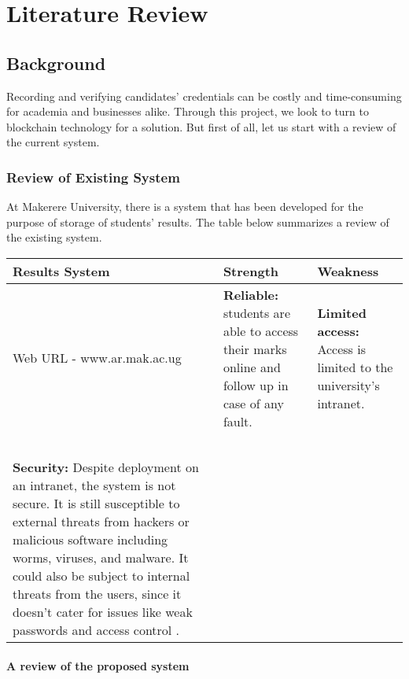 \chapter{Literature Review}

\section{Background}

Recording and verifying candidates' credentials can be costly and time-consuming for academia and businesses alike. Through this project, we look to turn to blockchain technology for a solution. But first of all, let us start with a review of the current system.\\

\subsection{Review of Existing System}
At Makerere University, there is a system that has been developed for the purpose of storage of students’ results. The table below summarizes a review of the existing system.

\begin{tabular}{|p{3cm}|p{4cm}|p{7cm}|}
\hline
Results System&Strength&Weakness\\
\hline
\hline
Web URL - www.ar.mak.ac.ug& \textbf{Reliable:} students are able to access their marks online and follow up in case of any fault.& \textbf{Limited access:} Access is limited to the university’s intranet. \\~\\

\textbf{Security:} Despite deployment on an intranet, the system is not secure. It is still susceptible to external threats from hackers or malicious software including worms, viruses, and malware. It could also be subject to internal threats from the users, since it doesn’t cater for issues like weak passwords and access control \cite{art3}.
\\ 
\hline

\end{tabular}

\subsubsection{A review of the proposed system}

